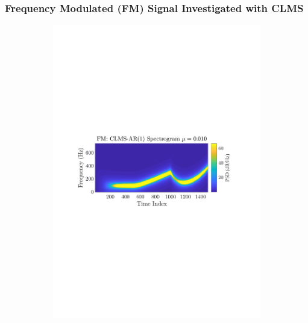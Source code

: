 \documentclass[12pt]{article}
\numberwithin{equation}{section}
\begin{document}
		\subsubsection{Frequency Modulated (FM) Signal Investigated with CLMS}
			\begin{figure}[H]
				\centering
				\begin{subfigure}{0.49\textwidth}
					\centering
					\includegraphics[trim={2.2cm 11.2cm 3.00cm  11.2cm}, clip, width=\textwidth]{../MATLAB/figures/q3_2b_fig02.pdf} 
					\captionsetup{justification=centering}
				\end{subfigure}
				\begin{subfigure}{0.49\textwidth}
					\centering

\end{subfigure}
\end{figure}
\end{document}
